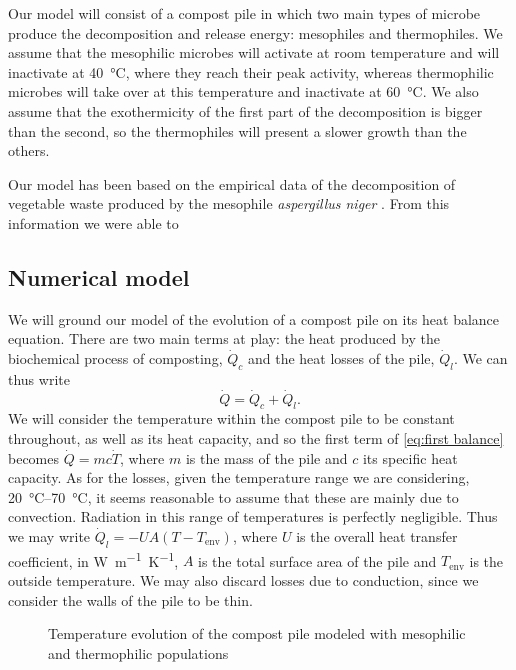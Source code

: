 \documentclass[12pt, a4paper, twocolumn]{article}
\numberwithin{table}{section}
\numberwithin{figure}{section}
\numberwithin{equation}{section}
\begin{document}
Our model will consist of a compost pile in which two main types of microbe produce the decomposition and release energy: mesophiles and thermophiles. We assume that the mesophilic microbes will activate at room temperature and will inactivate at \SI{40}{\celsius}, where they reach their peak activity, whereas thermophilic microbes will take over at this temperature and inactivate at \SI{60}{\celsius}. We also assume that the exothermicity of the first part of the decomposition is bigger than the second, so the thermophiles will present a slower growth than the others.

Our model has been based on the empirical data of the decomposition of vegetable waste produced by the mesophile \textit{aspergillus niger} \cite{saucedo}. From this information we were able to 

\subsection{Numerical model}
We will ground our model of the evolution of a compost pile on its heat balance equation. There are two main terms at play: the heat produced by the biochemical process of composting, \( \dot{Q}_c \) and the heat losses of the pile, \( \dot{Q}_l \). We can thus write
\begin{equation} \label{eq:first balance}
	\dot{Q} = \dot{Q}_c + \dot{Q}_l. 
\end{equation}
We will consider the temperature within the compost pile to be constant throughout, as well as its heat capacity, and so the first term of \cref{eq:first balance} becomes \( \dot{Q} = mc\dot{T} \), where \( m \) is the mass of the pile and \( c \) its specific heat capacity. As for the losses, given the temperature range we are considering, \SIrange{20}{70}{\celsius}, it seems reasonable to assume that these are mainly due to convection. Radiation in this range of temperatures is perfectly negligible. Thus we may write \( \dot{Q}_l = -UA\left(T - T_\text{env}\right) \), where \( U \) is the overall heat transfer coefficient, in \si{W.m^{-1}.K^{-1}}, \( A \) is the total surface area of the pile and \( T_\text{env} \) is the outside temperature. We may also discard losses due to conduction, since we consider the walls of the pile to be thin.

\begin{figure}[htb]
	\sffamily \footnotesize \centering
	
	\caption{Temperature evolution of the compost pile modeled with mesophilic and thermophilic populations}
	\label{fig:temp-mesos-termos}
\end{figure}
\end{document}
